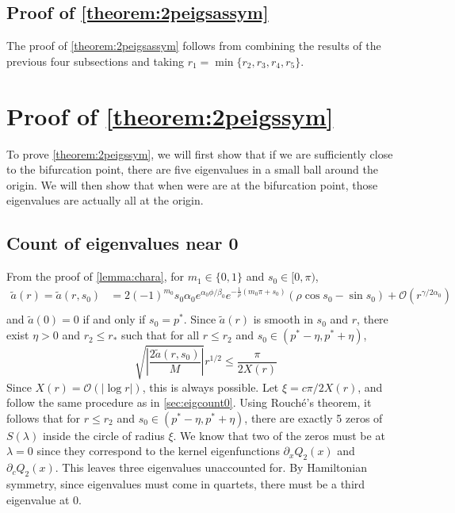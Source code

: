\documentclass[thesis.tex]{subfiles}
\begin{document}
\subsection{Proof of \cref{theorem:2peigsassym}}

The proof of \cref{theorem:2peigsassym} follows from combining the results of the previous four subsections and taking $r_1 = \min\{ r_2, r_3, r_4, r_5 \}$.

\section{Proof of \cref{theorem:2peigssym}}

To prove \cref{theorem:2peigssym}, we will first show that if we are sufficiently close to the bifurcation point, there are five eigenvalues in a small ball around the origin. We will then show that when were are at the bifurcation point, those eigenvalues are actually all at the origin.

\subsection{Count of eigenvalues near 0}

From the proof of \cref{lemma:chara}, for $m_1 \in \{0, 1\}$ and $s_0 \in [0, \pi)$,
\begin{align*}
\tilde{a}(r) = \tilde{a}(r, s_0) &= 2 (-1)^{m_0} s_0 \alpha_0 e^{\alpha_0 \phi/\beta_0} e^{-\frac{1}{\rho}(m_0 \pi + s_0) } \left( \rho \cos s_0 - \sin s_0 \right) + \mathcal{O}\left(r^{\gamma/2\alpha_0} \right)\\
\end{align*}
and $\tilde{a}(0) = 0$ if and only if $s_0 = p^*$. Since $\tilde{a}(r)$ is smooth in $s_0$ and $r$, there exist $\eta > 0$ and $r_2 \leq r_*$ such that for all $r \leq r_2$ and $s_0 \in (p^* - \eta, p^* + \eta)$, 
\begin{equation}
\sqrt{ \left| \frac{ 2 \tilde{a}(r, s_0) }{M} \right| }  r^{1/2} \leq \frac{\pi}{2 X(r)}
\end{equation}
Since $X(r) = \mathcal{O}(|\log r|)$, this is always possible. Let $\xi = c \pi / 2 X(r)$, and follow the same procedure as in \cref{sec:eigcount0}. Using Rouch\'{e}'s theorem, it follows that for $r \leq r_2$ and $s_0 \in (p^* - \eta, p^* + \eta)$, there are exactly 5 zeros of $S(\lambda)$ inside the circle of radius $\xi$. We know that two of the zeros must be at $\lambda = 0$ since they correspond to the kernel eigenfunctions $\partial_x Q_2(x)$ and $\partial_c Q_2(x)$. This leaves three eigenvalues unaccounted for.
By Hamiltonian symmetry, since eigenvalues must come in quartets, there must be a third eigenvalue at 0.
\end{document}
